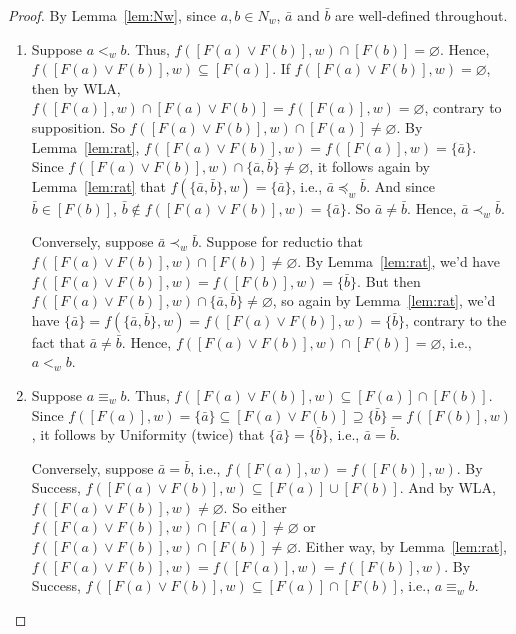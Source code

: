 \documentclass[12pt]{article}
\begin{document}
\begin{proof}
By Lemma~\ref{lem:Nw}, since $a,b \in N_w$, $\bar{a}$ and $\bar{b}$ are well-defined throughout. 
\begin{enumerate}
    \item Suppose $a <_w b$. 
    Thus, $f([F(a) \vee F(b)],w) \cap [F(b)] = \varnothing$. 
    Hence, $f([F(a) \vee F(b)],w) \subseteq [F(a)]$. 
    If $f([F(a) \vee F(b)],w) = \varnothing$, then by WLA, $f([F(a)],w) \cap [F(a) \vee F(b)] = f([F(a)],w) = \varnothing$, contrary to supposition. 
    So $f([F(a) \vee F(b)],w) \cap [F(a)] \neq \varnothing$. 
    By Lemma~\ref{lem:rat}, $f([F(a) \vee F(b)],w) = f([F(a)],w) = \{\bar{a}\}$. 
    Since $f([F(a) \vee F(b)],w) \cap \{\bar{a},\bar{b}\} \neq \varnothing$, it follows again by Lemma~\ref{lem:rat} that $f(\{\bar{a},\bar{b}\},w) = \{\bar{a}\}$, i.e., $\bar{a} \preceq_w \bar{b}$. 
    And since $\bar{b} \in [F(b)]$, $\bar{b} \notin f([F(a) \vee F(b)],w) = \{\bar{a}\}$. 
    So $\bar{a} \neq \bar{b}$. Hence, $\bar{a} \prec_w \bar{b}$.

    Conversely, suppose $\bar{a} \prec_w \bar{b}$. 
    Suppose for reductio that $f([F(a) \vee F(b)],w) \cap [F(b)] \neq \varnothing$. 
    By Lemma~\ref{lem:rat}, we'd have $f([F(a) \vee F(b)],w) = f([F(b)],w) = \{\bar{b}\}$. 
    But then $f([F(a) \vee F(b)],w) \cap \{\bar{a},\bar{b}\} \neq \varnothing$, so again by Lemma~\ref{lem:rat}, we'd have $\{\bar{a}\} = f(\{\bar{a},\bar{b}\},w) = f([F(a) \vee F(b)],w) = \{\bar{b}\}$, contrary to the fact that $\bar{a} \neq \bar{b}$. 
    Hence, $f([F(a) \vee F(b)],w) \cap [F(b)] = \varnothing$, i.e., $a <_w b$. 

    \item Suppose $a \equiv_w b$. 
    Thus, $f([F(a) \vee F(b)],w) \subseteq [F(a)] \cap [F(b)]$. 
    Since $f([F(a)],w) = \{\bar{a}\} \subseteq [F(a) \vee F(b)] \supseteq \{\bar{b}\} = f([F(b)],w)$, it follows by Uniformity (twice) that $\{\bar{a}\} = \{\bar{b}\}$, i.e., $\bar{a} = \bar{b}$. 

    Conversely, suppose $\bar{a} = \bar{b}$, i.e., $f([F(a)],w) = f([F(b)],w)$. 
    By Success, $f([F(a) \vee F(b)],w) \subseteq [F(a)] \cup [F(b)]$. 
    And by WLA, $f([F(a) \vee F(b)],w) \neq \varnothing$. 
    So either $f([F(a) \vee F(b)],w) \cap [F(a)] \neq \varnothing$ or $f([F(a) \vee F(b)],w) \cap [F(b)] \neq \varnothing$. 
    Either way, by Lemma~\ref{lem:rat}, $f([F(a) \vee F(b)],w) = f([F(a)],w) = f([F(b)],w)$. 
    By Success, $f([F(a) \vee F(b)],w) \subseteq [F(a)] \cap [F(b)]$, i.e., $a \equiv_w b$. 
\end{enumerate}    
\end{proof}
\end{document}
